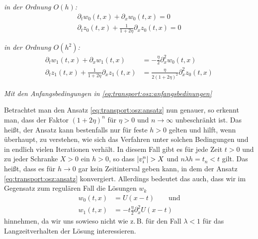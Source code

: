 \vspace{0.4cm}
\noindent \emph{in der Ordnung $O(h)$:}
\begin{align}
\partial_t w_0(t, x) + \partial_x w_0(t, x) = 0 \label{eq:transport:osz:oh_A}\\
\partial_t z_0(t, x) + \frac {1} {1 + 2\eta} \partial_x z_0(t, x) = 0 \label{eq:transport:osz:oh_B}
\end{align}

\noindent \emph{in der Ordnung $O(h^2)$:}
\begin{align}\label{eq:transport:osz:oh2_A}
\partial_t w_1(t, x) + \partial_x w_1(t, x) &= - \frac {\eta}{2} \partial^2_x w_0(t, x)\\
\partial_t z_1(t, x) + \frac{1}{1 + 2 \eta} \partial_x z_1(t, x) &= \frac{\eta}{2 (1 + 2 \eta)^2} \partial^2_x z_0(t, x) \label{eq:transport:osz:oh2_B}
\end{align}

\noindent \emph{Mit den Anfangsbedingungen in \eqref{eq:transport:osz:anfangsbedinungen}}

\vspace{0.4cm}
Betrachtet man den Ansatz \eqref{eq:transport:osz:ansatz} nun genauer, so erkennt man, dass der Faktor $(1 + 2 \eta)^n$ für $\eta > 0$ und $n \to \infty$ unbeschränkt ist.
Das heißt, der Ansatz kann bestenfalls nur für feste $h > 0$ gelten und hilft, wenn überhaupt, zu verstehen, wie sich das Verfahren unter solchen Bedingungen und in endlich vielen Iterationen verhält.
In diesem Fall gibt es für jede Zeit $t > 0$ und zu jeder Schranke $X > 0$ ein $h > 0$, so dass $\left| v^n_i \right| > X$ und $n \lambda h = t_n < t$ gilt.
Das heißt, dass es für $h \to 0$ gar kein Zeitinterval geben kann, in dem der Ansatz \eqref{eq:transport:osz:ansatz} konvergiert. 
Allerdings bedeutet das auch, dass wir im Gegensatz zum regulären Fall die Lösungen $w_k$
\begin{align}\label{eq:transport:osz:wk_loesungen}
w_0(t, x) &= U(x - t) \qquad \text{und}\\
w_1(t, x) &= - t \frac{\eta} 2 \partial^2_x U(x - t)
\end{align}
hinnehmen, da wir uns sowieso nicht wie z.\,B. für den Fall $\lambda < 1$ für das Langzeitverhalten der Lösung interessieren.


